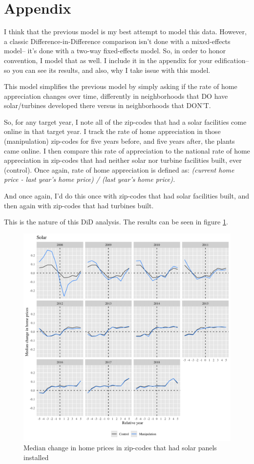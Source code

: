 \documentclass{article}
\begin{document}
\section{Appendix}

I think that the previous model is my best attempt to model this data.
However, a classic Difference-in-Difference comparison isn't done with a mixed-effects model-- it's done with a two-way fixed-effects model.
So, in order to honor convention, I model that as well.
I include it in the appendix for your edification-- so you can see its results, and also, why I take issue with this model.

This model simplifies the previous model by simply asking if the rate of home appreciation changes over time, differently in neighborhoods that DO have solar/turbines developed there versus in neighborhoods that DON'T.

So, for any target year, I note all of the zip-codes that had a solar facilities come online in that target year.
I track the rate of home appreciation in those (manipulation) zip-codes for five years before, and five years after, the plants came online.
I then compare this rate of appreciation to the national rate of home appreciation in zip-codes that had neither solar nor turbine facilities built, ever (control).
Once again, rate of home appreciation is defined as:
\noindent\textit{(current home price - last year's home price) / (last year's home price). }

And once again, I'd do this once with zip-codes that had solar facilities built, and then again with zip-codes that had turbines built.

This is the nature of this DiD analysis.
The results can be seen in figure \ref{study1solarfacets}.
\begin{figure}[h]
\centering
\includegraphics[width=0.9\linewidth]
{study1_solar_facets.png} 
\caption{Median change in home prices in zip-codes that had solar panels installed}
\label{study1solarfacets}
\end{figure}
\end{document}
